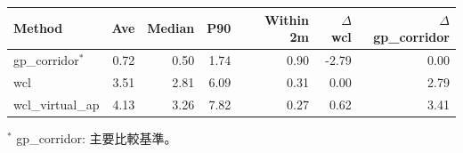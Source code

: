\begin{tabular}{lrrrrrr}
\toprule
Method & Ave & Median & P90 & Within 2m & $\Delta$wcl & $\Delta$gp\_corridor \\
\midrule
gp\_corridor$^{\ast}$ & 0.72 & 0.50 & 1.74 & 0.90 & -2.79 & 0.00 \\
wcl & 3.51 & 2.81 & 6.09 & 0.31 & 0.00 & 2.79 \\
wcl\_virtual\_ap & 4.13 & 3.26 & 7.82 & 0.27 & 0.62 & 3.41 \\
\bottomrule
\end{tabular}
\par\footnotesize $^{\ast}$ gp\_corridor: 主要比較基準。
